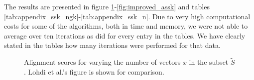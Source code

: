 
The results are presented in figure \ref{fig:alignment}-\ref{fig:improved_assk} and tables \ref{tab:appendix_ssk_ngk}-\ref{tab:appendix_ssk_n}. Due to very high computational costs for some of the algorithms, both in time and memory, we were  not able to average over ten iterations as \cite{lodhi} did for every entry in the tables. We have clearly stated in the tables how many iterations were performed for that data. 

\begin{figure}[!htb]	
	\centering
	\caption{Alignment scores for varying the number of vectors $ x $ in the subset $ \tilde{S} $. Lohdi et al.'s figure is shown for comparison.\label{fig:alignment}}
\end{figure}


